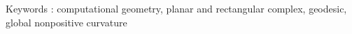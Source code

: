 \lipsum[1]

\vspace{0.5cm}
Keywords : computational geometry, planar and rectangular complex, geodesic, global nonpositive curvature